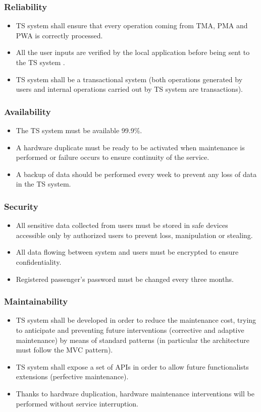 \subsubsection{Reliability}
\begin{itemize}
\item TS system shall ensure that every operation coming from TMA, PMA and
PWA is correctly processed.
\item All the user inputs are verified by the local application before being
sent to the TS system .
\item TS system shall be a transactional system (both operations generated
by users and internal operations carried out by TS system are transactions).
\end{itemize}

\subsubsection{Availability }
\begin{itemize}
\item The TS system must be available 99.9\%. 
\item A hardware duplicate must be ready to be activated when maintenance
is performed or failure occurs to ensure continuity of the service.
\item A backup of data should be performed every week to prevent any loss
of data in the TS system.
\end{itemize}

\subsubsection{Security }
\begin{itemize}
\item All sensitive data collected from users must be stored in safe devices
accessible only by authorized users to prevent loss, manipulation
or stealing.
\item All data flowing between system and users must be encrypted to ensure
confidentiality.
\item Registered passenger's password must be changed every three months.
\end{itemize}

\subsubsection{Maintainability }
\begin{itemize}
\item TS system shall be developed in order to reduce the maintenance cost,
trying to anticipate and preventing future interventions (corrective
and adaptive maintenance) by means of standard patterns (in particular
the architecture must follow the MVC pattern).
\item TS system shall expose a set of APIs in order to allow future functionalists
extensions (perfective maintenance).
\item Thanks to hardware duplication, hardware maintenance interventions
will be performed without service interruption.
\end{itemize}

